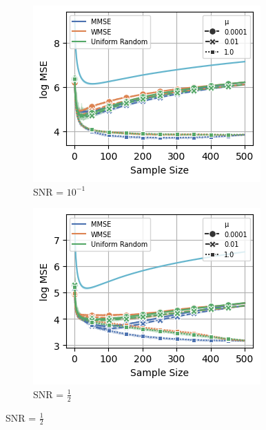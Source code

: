 \begin{figure}%
    \centering
    \begin{subfigure}{0.3\columnwidth}
    \includegraphics[width=\columnwidth]{figures/proj1/plots/GLR_MSE/BA_3_500_bandwidth_50_SNRdbs_-10.0_samps_500_mus_0.0001_0.01_1_full_band.png}
    \caption{SNR = $10^{-1}$}
    \label{GLR_BA_MSE_subfiga}
    \end{subfigure}\hfill
    \begin{subfigure}{0.3\columnwidth}
    \includegraphics[width=\columnwidth]{figures/proj1/plots/GLR_MSE/BA_3_500_bandwidth_50_SNRdbs_-3.01_samps_500_mus_0.0001_0.01_1_full_band.png}
    \caption{SNR = $\frac{1}{2}$}%

\end{subfigure}
\end{figure}
